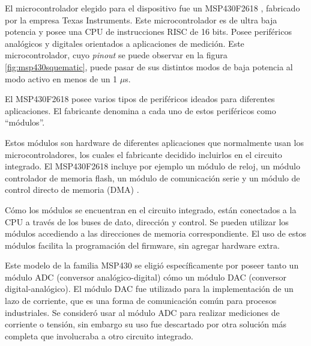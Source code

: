 
El microcontrolador elegido para el dispositivo fue un MSP430F2618 \cite{msp430freff}, fabricado por la empresa Texas Instruments. Este microcontrolador es de ultra baja potencia y posee una CPU de instrucciones RISC de 16 bits. Posee periféricos analógicos y digitales orientados a aplicaciones de medición. Este microcontrolador, cuyo \textit{pinout} se puede observar en la figura \ref{fig:msp430squematic}, puede pasar de sus distintos modos de baja potencia al modo activo en menos de un 1 $\mu$s.



El MSP430F2618 posee varios tipos de periféricos ideados para diferentes aplicaciones. El fabricante denomina a cada uno de estos periféricos como \textquotedblleft módulos\textquotedblright .
 
Estos módulos son hardware de diferentes aplicaciones que normalmente usan los microcontroladores, los cuales el fabricante decidido incluirlos en el circuito integrado. El MSP430F2618 incluye por ejemplo un módulo de reloj, un módulo controlador de memoria flash, un módulo de comunicación serie y un módulo de control directo de memoria (DMA) \cite{msp430slau144j}. 

Cómo los módulos se encuentran en el circuito integrado, están conectados a la CPU a través de los buses de dato, dirección y control. Se pueden utilizar los módulos accediendo a las direcciones de memoria correspondiente. El uso de estos módulos facilita la programación del firmware, sin agregar hardware extra.

 



Este modelo de la familia MSP430 se eligió específicamente por poseer tanto un módulo ADC (conversor analógico-digital) cómo un módulo DAC (conversor digital-analógico). El módulo DAC fue utilizado para la implementación de un lazo de corriente, que es una forma de comunicación común para procesos industriales. Se consideró usar al módulo ADC para realizar mediciones de corriente o tensión, sin embargo su uso fue descartado por otra solución más completa que involucraba a otro circuito integrado.

